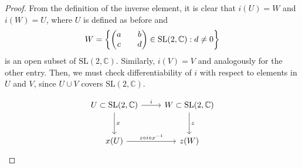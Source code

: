 \begin{proof}
    From the definition of the inverse element, it is clear that \(i(U) = W\) and \(i(W) = U\), where \(U\) is defined as before and
    \begin{equation*}
        W = \set*{\begin{pmatrix}
                a && b\\c&&d
        \end{pmatrix} \in \mathrm{SL}(2, \mathbb{C}) : d \neq 0}
    \end{equation*}
    is an open subset of \(\mathrm{SL}(2, \mathbb{C}).\) Similarly, \(i(V) = V\) and analogously for the other entry. Then, we must check differentiability of \(i\) with respect to elements in \(U\) and \(V\), since \(U \cup V\) covers \(\mathrm{SL}(2, \mathbb{C}) \).

    \begin{equation*}
        \begin{tikzcd}[column sep = normal, row sep = large]
            U \subset \mathrm{SL}(2, \mathbb{C}) \arrow{r}{i} \arrow{d}{x}& W \subset \mathrm{SL}(2,\mathbb{C}) \arrow{d}{z}\\
            x(U) \arrow{r}{z \circ i \circ x^{-1}} & z(W)
        \end{tikzcd}
    \end{equation*}


\end{proof}
